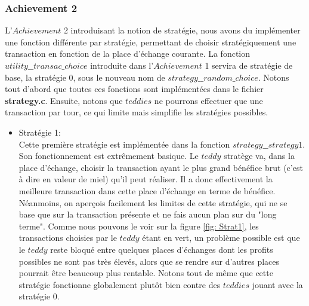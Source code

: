 \documentclass{article}
\begin{document}
\subsubsection{Achievement 2}
L'$Achievement$ 2 introduisant la notion de stratégie, nous avons du implémenter une fonction différente par stratégie, permettant de choisir stratégiquement une transaction en fonction de la place d'échange courante. La fonction $utility\_\_transac\_choice$ introduite dans l'$Achievement$ 1 servira de stratégie de base, la stratégie 0, sous le nouveau nom de $strategy\_\_random\_choice$. Notons tout d'abord que toutes ces fonctions sont implémentées dans le fichier \textbf{strategy.c}. Ensuite, notons que $teddies$ ne pourrons effectuer que une transaction par tour, ce qui limite mais simplifie les stratégies possibles.
\begin{itemize}
    \item Stratégie 1:\\
    Cette première stratégie est implémentée dans la fonction $strategy\_\_strategy1$. Son fonctionnement est extrêmement basique. Le $teddy$ stratège va, dans la place d'échange, choisir la transaction ayant le plus grand bénéfice brut (c'est à dire en valeur de miel) qu'il peut réaliser. Il a donc effectivement la meilleure transaction dans cette place d'échange en terme de bénéfice. Néanmoins, on aperçois facilement les limites de cette stratégie, qui ne se base que sur la transaction présente et ne fais aucun plan sur du "long terme". Comme nous pouvons le voir sur la figure \ref{fig: Strat1}, les transactions choisies par le $teddy$ étant en vert, un problème possible est que le $teddy$ reste bloqué entre quelques places d'échanges dont les profits possibles ne sont pas très élevés, alors que se rendre sur d'autres places pourrait être beaucoup plus rentable. Notons tout de même que cette stratégie fonctionne globalement plutôt bien contre des $teddies$ jouant avec la stratégie 0.
    \begin{figure}[h]
        \centering
\end{figure}
\end{itemize}
\end{document}
